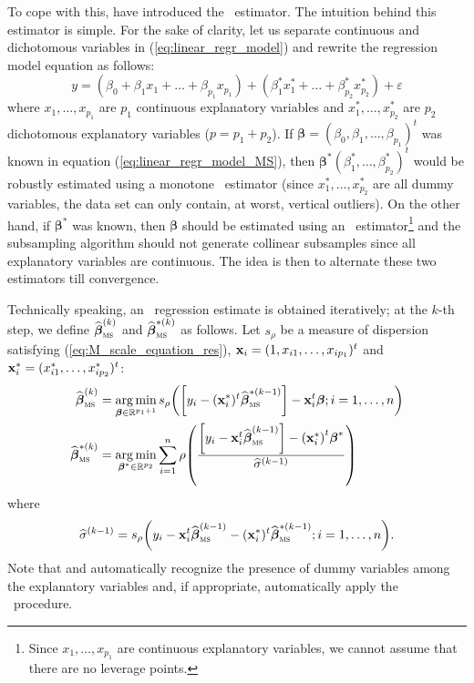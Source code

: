 To cope with this, \citet{maronna:yohai:2000} have introduced the ~estimator.
The intuition behind this estimator is simple. For the sake of clarity, let us
separate continuous and dichotomous variables in (\ref{eq:linear_regr_model})
and rewrite the regression model equation as follows:
%
\begin{equation}\label{eq:linear_regr_model_MS}
    y = (\beta_0 + \beta_1x_1 + \dots + \beta_{p_1}x_{p_1})
    + (\beta_1^*x_1^* + \dots + \beta_{p_2}^*x_{p_2}^*) + \varepsilon
\end{equation}
%
where $x_1, \dots, x_{p_1}$ are $p_1$ continuous explanatory variables and
$x_1^*, \dots, x_{p_2}^*$ are $p_2$ dichotomous explanatory variables ($p = p_1
+ p_2$). If $\boldsymbol\beta = (\beta_0, \beta_1, \dots, \beta_{p_1})^t$ was
known in equation (\ref{eq:linear_regr_model_MS}), then $\boldsymbol\beta^*%
(\beta_1^*, \dots, \beta_{p_2}^*)^t$ would be robustly estimated using a
monotone ~estimator (since $x_1^*, \dots, x_{p_2}^*$ are all dummy
variables, the data set can only contain, at worst, vertical outliers). On the
other hand, if $\boldsymbol\beta^*$ was known, then $\boldsymbol\beta$ should
be estimated using an ~estimator\footnote{Since $x_1, \dots, x_{p_1}$
are continuous explanatory variables, we cannot assume that there are no
leverage points.} and the subsampling algorithm should not generate collinear
subsamples since all explanatory variables are continuous. The idea is then to
alternate these two estimators till convergence.

Technically speaking, an ~regression estimate is obtained iteratively;
at the $k$-th step, we define $\sthat{\boldsymbol\beta}_{\stsc{MS}}^{(k)}$ and
$\sthat{\boldsymbol\beta}_{\stsc{MS}}^{*(k)}$ as follows. Let $s_\rho$ be a
measure of dispersion satisfying (\ref{eq:M_scale_equation_res}), $\mathbf x_i
= (1, x_{i1}, \dots, x_{ip_1})^t$ and $\mathbf x_i^* = (x_{i1}^*, \dots,
x_{ip_2}^*)^t$:
\[
    \begin{aligned}
        \sthat{\boldsymbol\beta}_{\stsc{MS}}^{(k)} 
        & = \argmin_{\boldsymbol\beta \in \mathbb{R}^{p_1 + 1}}
        s_\rho\left(\left[y_i - (\stvec{x}_i^*)^t \sthat{\boldsymbol\beta}_{\stsc{MS}}^{*(k-1)}\right] 
        - \stvec{x}_i^t \boldsymbol\beta; i = 1, \dots, n\right)
        \\
        \sthat{\boldsymbol\beta}_{\stsc{MS}}^{*(k)} 
        & = \argmin_{\boldsymbol\beta^* \in \mathbb{R}^{p_2}}
        \sum_{i=1}^{n} \rho\left(\frac{\left[y_i - \stvec{x}_i^t\sthat{\boldsymbol\beta}_{\stsc{MS}}^{(k-1)}\right] 
        - \left(\stvec{x}_i^*\right)^t \boldsymbol\beta^*}{\sthat{\sigma}^{(k-1)}}\right)
    \end{aligned}
\]
where 
\[
    \sthat{\sigma}^{(k-1)} = s_\rho 
    \left(y_i - \stvec{x}_i^t \sthat{\boldsymbol\beta}_{\stsc{MS}}^{(k-1)}
    - (\stvec{x}_i^*)^t \sthat{\boldsymbol\beta}_{\stsc{MS}}^{*(k-1)}
    ; i = 1, \dots, n\right).
\]
Note that  and  automatically recognize the
presence of dummy variables among the explanatory variables and, if
appropriate, automatically apply the ~procedure.

